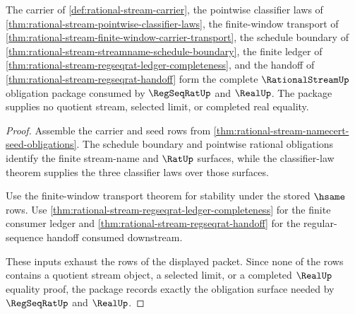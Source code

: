 \begin{theorem}
\label{thm:rational-stream-regseqrat-obligation-package}
The carrier of \autoref{def:rational-stream-carrier}, the pointwise classifier
laws of \autoref{thm:rational-stream-pointwise-classifier-laws}, the
finite-window transport of
\autoref{thm:rational-stream-finite-window-carrier-transport}, the schedule
boundary of \autoref{thm:rational-stream-streamname-schedule-boundary}, the
finite ledger of \autoref{thm:rational-stream-regseqrat-ledger-completeness},
and the handoff of \autoref{thm:rational-stream-regseqrat-handoff} form the
complete $\RationalStreamUp$ obligation package consumed by $\RegSeqRatUp$ and
$\RealUp$. The package supplies no quotient stream, selected limit, or
completed real equality.
\end{theorem}
\begin{proof}
Assemble the carrier and seed rows from
\autoref{thm:rational-stream-namecert-seed-obligations}. The schedule boundary
and pointwise rational obligations identify the finite stream-name and
$\RatUp$ surfaces, while the classifier-law theorem supplies the three
classifier laws over those surfaces.

Use the finite-window transport theorem for stability under the stored
$\hsame$ rows. Use \autoref{thm:rational-stream-regseqrat-ledger-completeness}
for the finite consumer ledger and
\autoref{thm:rational-stream-regseqrat-handoff} for the regular-sequence
handoff consumed downstream.

These inputs exhaust the rows of the displayed packet. Since none of the rows
contains a quotient stream object, a selected limit, or a completed $\RealUp$
equality proof, the package records exactly the obligation surface needed by
$\RegSeqRatUp$ and $\RealUp$.
\end{proof}

